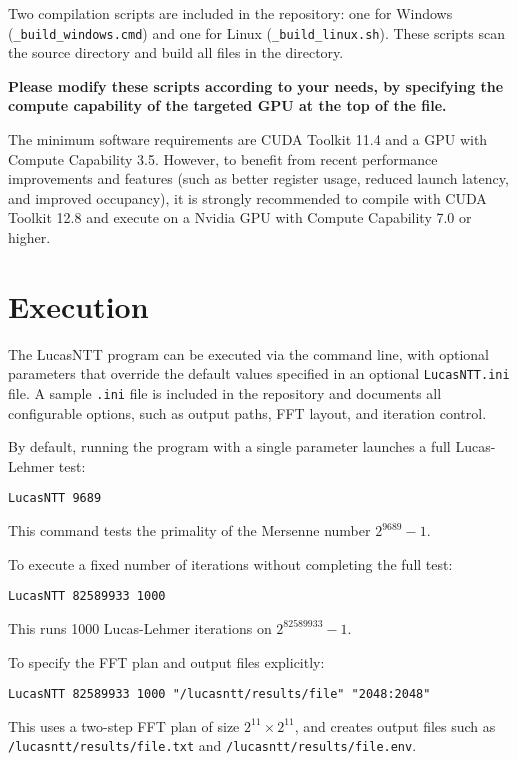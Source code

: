 \documentclass{article}
\begin{document}
Two compilation scripts are included in the repository: one for Windows (\texttt{\_build\_windows.cmd}) and one for Linux (\texttt{\_build\_linux.sh}). These scripts scan the source directory and build all files in the directory.

\textbf{Please modify these scripts according to your needs, by specifying the compute capability of the targeted GPU at the top of the file.}

The minimum software requirements are CUDA Toolkit 11.4 and a GPU with Compute Capability 3.5. 
However, to benefit from recent performance improvements and features (such as better register usage, reduced launch latency, and improved occupancy), it is strongly recommended to compile with CUDA Toolkit 12.8 and execute on a Nvidia GPU with Compute Capability 7.0 or higher.

\newpage
\section{Execution}

The LucasNTT program can be executed via the command line, with optional parameters that override the default values specified in an optional \texttt{LucasNTT.ini} file. A sample \texttt{.ini} file is included in the repository and documents all configurable options, such as output paths, FFT layout, and iteration control.

By default, running the program with a single parameter launches a full Lucas-Lehmer test:
\begin{verbatim}
LucasNTT 9689
\end{verbatim}
This command tests the primality of the Mersenne number $2^{9689} - 1$.

To execute a fixed number of iterations without completing the full test:
\begin{verbatim}
LucasNTT 82589933 1000
\end{verbatim}
This runs 1000 Lucas-Lehmer iterations on $2^{82589933} - 1$.

To specify the FFT plan and output files explicitly:
\begin{verbatim}
LucasNTT 82589933 1000 "/lucasntt/results/file" "2048:2048"
\end{verbatim}
This uses a two-step FFT plan of size $2^{11} \times 2^{11}$, and creates output files such as  \texttt{/lucasntt/results/file.txt} and \texttt{/lucasntt/results/file.env}.
\end{document}
